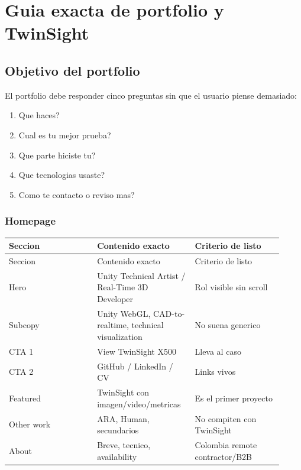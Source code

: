 \chapter{Guia exacta de portfolio y TwinSight}

\section{Objetivo del portfolio}


El portfolio debe responder cinco preguntas sin que el usuario piense demasiado:


\begin{enumerate}
\item Que haces?
\item Cual es tu mejor prueba?
\item Que parte hiciste tu?
\item Que tecnologias usaste?
\item Como te contacto o reviso mas?
\end{enumerate}


\subsection{Homepage}


\begin{center}
\scriptsize
\begin{longtable}{>{\raggedright\arraybackslash}p{0.305\linewidth} >{\raggedright\arraybackslash}p{0.305\linewidth} >{\raggedright\arraybackslash}p{0.305\linewidth}}
\toprule
Seccion & Contenido exacto & Criterio de listo \\
\midrule
\endfirsthead
\toprule
Seccion & Contenido exacto & Criterio de listo \\
\midrule
\endhead
Hero & Unity Technical Artist / Real-Time 3D Developer & Rol visible sin scroll \\
Subcopy & Unity WebGL, CAD-to-realtime, technical visualization & No suena generico \\
CTA 1 & View TwinSight X500 & Lleva al caso \\
CTA 2 & GitHub / LinkedIn / CV & Links vivos \\
Featured & TwinSight con imagen/video/metricas & Es el primer proyecto \\
Other work & ARA, Human, secundarios & No compiten con TwinSight \\
About & Breve, tecnico, availability & Colombia remote contractor/B2B \\
\bottomrule
\end{longtable}
\end{center}



